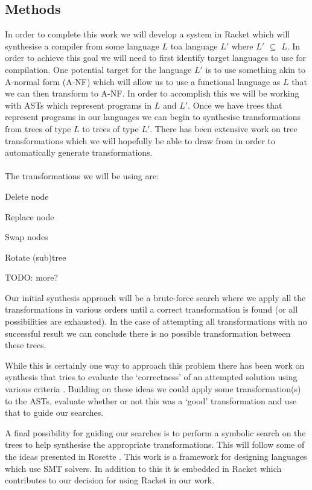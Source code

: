 \documentclass[twoside]{article}
\begin{document}
\begin{multicols}{2}
\section{Methods}
In order to complete this work we will develop a system in Racket
\cite{racket} which will synthesise a compiler from some language $L$
toa language $L'$  where $L'$ $\subseteq$ $L$. In order to achieve this 
goal we will need to first identify target languages to use for
compilation. One potential target for the language $L'$  is to use
something akin to A-normal form (A-NF) \cite {anf} which will allow us
to use a functional language as $L$ that we can then transform to
A-NF. In order to accomplish this we will be working with ASTs which
represent programs in $L$  and $L'$. Once we have trees that represent
programs in our languages we can begin to synthesise transformations
from trees of type $L$ to trees of type $L'$. There has been extensive
work on tree transformations \cite{bek,fast} which we will hopefully
be able to draw from in order to automatically generate
transformations. \\\\The transformations we will be using are:
\begin{compactitem}
\item Delete node
\item Replace node
\item Swap nodes
\item Rotate (sub)tree
\item TODO: more?
\end{compactitem}

Our initial synthesis approach will be a brute-force search where we
apply all the transformations in various orders until a correct
transformation is found (or all possibilities are exhausted). In the
case of attempting all transformations with no successful result we
can conclude there is no possible transformation between these trees.

While this is certainly one way to approach this problem there has
been work on synthesis that tries to evaluate the `correctness' of an
attempted solution using various criteria
\cite{genprog,invert}. Building on these ideas we could apply some
transformation(s) to the ASTs, evaluate whether or not this was a
`good' transformation and use that to guide our searches.

A final possibility for guiding our searches is to perform a symbolic
search on the trees to help synthesise the appropriate
transformations. This will follow some of the ideas presented in
Rosette \cite{rosette}. This work is a framework for designing
languages which use SMT solvers. In addition to this it is embedded in
Racket which contributes to our decision for using Racket in our work.


\end{multicols}
\end{document}

